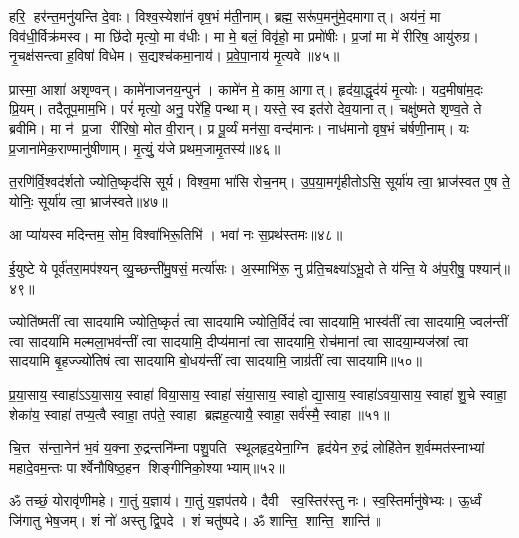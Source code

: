 हरि॒ हर॑न्त॒मनु॑यन्ति दे॒वाः। विश्व॒स्येशा॑नं वृष॒भं म॑ती॒नाम्। ब्रह्म॒ सरू॑प॒मनु॑मे॒दमागात्। अय॑नं॒ मा विव॑धी॒र्विक्र॑मस्व। मा छि॑दो मृत्यो॒ मा व॑धीः। मा मे॒ बलं॒  विवृ॑हो॒ मा प्रमो॑षीः। प्र॒जां मा मे॑ रीरिष॒ आयु॑रुग्र। नृ॒चक्ष॑सन्त्वा ह॒विषा॑ विधेम। स॒द्यश्च॑कमा॒नाय॑। प्र॒वे॒पा॒नाय॑ मृ॒त्यवे॥४५॥

प्रास्मा॒ आशा॑ अशृण्वन्। कामे॑नाजनय॒न्पुन॑। कामे॑न मे॒ काम॒ आगात्। हृद॑या॒द्धृद॑यं मृ॒त्योः। यद॒मीषा॑म॒दः प्रि॒यम्। तदैतूप॒माम॒भि। परं॑ मृत्यो॒ अनु॒ परे॑हि॒ पन्थाम्। यस्ते॒ स्व इत॑रो देव॒यानात्। चक्षु॑ष्मते शृण्व॒ते ते ब्रवीमि। मा न॑ प्र॒जा री॑रिषो॒ मोत वी॒रान्। प्र पू॒र्व्यं मन॑सा॒ वन्द॑मानः। नाध॑मानो वृष॒भं च॑र्\mbox{}षणी॒नाम्। यः प्र॒जाना॑मेक॒राण्मानु॑षीणाम्। मृ॒त्युं॒ य॑जे प्रथम॒जामृ॒तस्य॑॥४६॥
\anuvakamend[मृ॒त्यवे॑ वी॒राश्च॒त्वारि॑ च]

त॒रणि॑र्वि॒श्वद॑र्\mbox{}शतो ज्योति॒ष्कृद॑सि सूर्य। विश्व॒मा भा॑सि रोच॒नम्। उ॒प॒या॒मगृ॑हीतोऽसि॒ सूर्या॑य त्वा॒ भ्राज॑स्वत ए॒ष ते॒ योनिः॒ सूर्या॑य त्वा॒ भ्राज॑स्वते॥४७॥
\anuvakamend

आ प्या॑यस्व मदिन्तम॒ सोम॒ विश्वा॑भिरू॒तिभि॑। भवा॑ नः स॒प्रथ॑स्तमः॥४८॥
\anuvakamend

ई॒युष्टे ये पूर्व॑तरा॒मप॑श्यन् व्यु॒च्छन्ती॑मु॒षसं॒ मर्त्या॑सः। अ॒स्माभि॑रू॒ नु प्र॑ति॒चक्ष्या॑ऽभू॒दो ते य॑न्ति॒ ये अ॑प॒रीषु॒ पश्यान्॑॥४९॥
\anuvakamend

ज्योति॑ष्मतीं त्वा सादयामि ज्योति॒ष्कृतं॑ त्वा सादयामि ज्योति॒र्विदं॑ त्वा सादयामि॒ भास्व॑तीं त्वा सादयामि॒ ज्वल॑न्तीं त्वा सादयामि मल्मला॒भव॑न्तीं त्वा सादयामि॒ दीप्य॑मानां त्वा सादयामि॒ रोच॑मानां त्वा सादया॒म्यज॑स्रां त्वा सादयामि बृ॒हज्ज्यो॑तिषं त्वा सादयामि बो॒धय॑न्तीं त्वा सादयामि॒ जाग्र॑तीं त्वा सादयामि॥५०॥
\anuvakamend

प्र॒या॒साय॒ स्वाहा॑ऽऽया॒साय॒ स्वाहा॑ विया॒साय॒ स्वाहा॑ संया॒साय॒ स्वाहोद्या॒साय॒ स्वाहा॑ऽवया॒साय॒ स्वाहा॑ शु॒चे स्वाहा॒ शेका॑य॒ स्वाहा॑ तप्य॒त्वै स्वाहा॒ तप॑ते॒ स्वाहा ब्रह्मह॒त्यायै॒ स्वाहा॒ सर्व॑स्मै॒ स्वाहा॥५१॥
\anuvakamend

चि॒त्त स॑न्ता॒नेन॑ भ॒वं य॒क्ना रु॒द्रन्तनि॑म्ना पशु॒पति स्थूलहृद॒येना॒ग्नि हृद॑येन रु॒द्रं लोहि॑तेन श॒र्वम्मत॑स्नाभ्यां महादे॒वम॒न्तः पार्श्वेनौषिष्ठ॒हन शिङ्गीनिको॒श्याभ्याम्॥५२॥
\anuvakamend

ॐ तच्छं॒ योरावृ॑णीमहे। गा॒तुं य॒ज्ञाय॑। गा॒तुं य॒ज्ञप॑तये। 
दैवी स्व॒स्तिर॑स्तु नः। स्व॒स्तिर्मानु॑षेभ्यः। ऊ॒र्ध्वं जि॑गातु भेष॒जम्। 
शं नो॑ अस्तु द्वि॒पदे। शं चतु॑ष्पदे। ॐ शान्ति॒ शान्ति॒ शान्ति॑॥

\closesection

